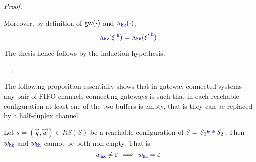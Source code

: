 \begin{proof}
\begin{description}
Moreover, by definition of $\mathsf{gw}(\cdot)$ and $\mbox{{\sc a}}_{{\mathtt{\color{blue}{ {h}}}}{\mathtt{\color{blue}{ {k}}}}}(\cdot)$, 
\begin{equation}
\label{eq:xipxi2}
\symb{\HH\KK}{\restrictup{\xi}{\HH}} = \symb{\HH\KK}{\restrictup{\xi'}{\HH}}
\end{equation}

The thesis hence follows by the induction hypothesis.

\end{description}

\end{proof}


The following proposition essentially shows that in gateway-connected systems any pair of FIFO channels  connecting
gateways is such that in each reachable configuration at least one of the two buffers is empty, that is they
 can be replaced by a half-duplex channel.

\begin{proposition}%
\label{lem:halfduplex}
Let $s= (\vec{q},\vec{w}) \in RS(S)$ be a reachable configuration of
$S={S_{1}}\stackrel{\hspace{-3pt}{ \ensuremath{\mathtt{\color{blue}{ {h}}}} }\!\leftrightarrow\!{\mathtt{\color{blue}{ {k}}}}\!}{} {S_{2}}$.
Then $w_{{\mathtt{\color{blue}{ {h}}}}{\mathtt{\color{blue}{ {k}}}}}$ and  $w_{{\mathtt{\color{blue}{ {k}}}}{\mathtt{\color{blue}{ {h}}}}}$ cannot be both non-empty. That is
$${w}_{{\mathtt{\color{blue}{ {h}}}}{\mathtt{\color{blue}{ {k}}}}}\neq \varepsilon ~\Longrightarrow~ {w}_{{\mathtt{\color{blue}{ {k}}}}{\mathtt{\color{blue}{ {h}}}}}= \varepsilon$$
\end{proposition}

